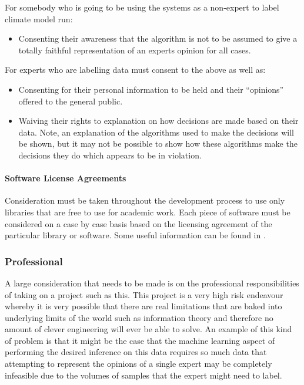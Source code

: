 \documentclass{ecmm427_assignment}
\begin{document}
For somebody who is going to be using the systems as a non-expert
to label climate model run:
\begin{itemize}
\item Consenting their awareness that the algorithm is not to be assumed
to give a totally faithful representation of an experts opinion for
all cases.
\end{itemize}
For experts who are labelling data must consent to the above as well
as:
\begin{itemize}
\item Consenting for their personal information to be held and their ``opinions''
offered to the general public.
\item Waiving their rights to explanation on how decisions are made based
on their data. Note, an explanation of the algorithms used to make
the decisions will be shown, but it may not be possible to show how
these algorithms make the decisions they do which appears to be in
violation.
\end{itemize}

\paragraph{Software License Agreements}

Consideration must be taken throughout the development process to use
only libraries that are free to use for academic work. Each piece of software must 
be considered on a case by case basis based on the licensing agreement of
the particular library or software. Some useful information can be found in \cite{ethicalandlegal}.


\subsubsection{Professional}

A large consideration that needs to be made is on the professional
responsibilities of taking on a project such as this. This project
is a very high risk endeavour whereby it is very possible that there
are real limitations that are baked into underlying limits of the world
such as information theory and therefore no amount of clever engineering
will ever be able to solve. An example of this kind of problem is
that it might be the case that the machine learning aspect of performing
the desired inference on this data requires so much data that attempting
to represent the opinions of a single expert may be completely infeasible
due to the volumes of samples that the expert might need to label. 
\end{document}
